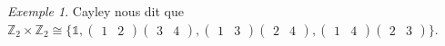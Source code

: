 \documentclass{report}
\newcommand*{\entiers}{\mathbb{Z}}
\newcommand*{\identite}{\mathds{1}}
\theoremstyle{definition}
\theoremstyle{remark}
\newtheorem*{exem}{Exemple}
\begin{document}
\begin{exem}
		Cayley nous dit que $\entiers_2 \times \entiers_2 \cong \{\identite, \begin{pmatrix}
			1&2
		\end{pmatrix} \begin{pmatrix}
			3&4
		\end{pmatrix}, \begin{pmatrix}
			1&3
		\end{pmatrix} \begin{pmatrix}
			2&4
		\end{pmatrix}, \begin{pmatrix}
			1&4
		\end{pmatrix} \begin{pmatrix}
			2&3
		\end{pmatrix}\}$.
	\end{exem}
\end{document}
